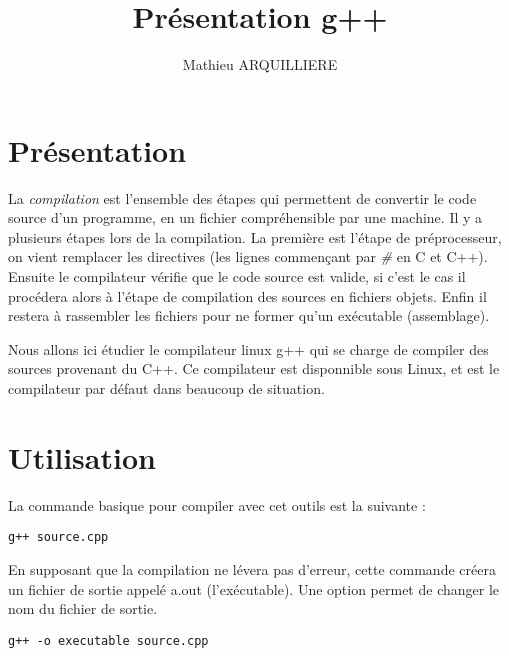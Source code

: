 \documentclass[a4paper, 12pt]{article}
\title{Présentation g++}
\author{Mathieu ARQUILLIERE}
\begin{document}
\maketitle
\pagebreak
\tableofcontents
\pagebreak
\section{Présentation}
    La \emph{compilation} est l'ensemble des étapes qui permettent de convertir le code source d'un programme, en un fichier compréhensible par une machine.
    Il y a plusieurs étapes lors de la compilation. La première est l'étape de préprocesseur, on vient remplacer les directives (les lignes commençant par \emph{\#} en C et C++).
    Ensuite le compilateur vérifie que le code source est valide, si c'est le cas il procédera alors à l'étape de compilation des sources en fichiers objets. Enfin il restera à rassembler les fichiers pour ne former qu'un exécutable (assemblage).

    Nous allons ici étudier le compilateur linux g++ qui se charge de compiler des sources provenant du C++.
    Ce compilateur est disponnible sous Linux, et est le compilateur par défaut dans beaucoup de situation.

\section{Utilisation}
    La commande basique pour compiler avec cet outils est la suivante :
    \begin{mdframed}[backgroundcolor=light-gray, roundcorner=20pt,
        innerleftmargin=20, innertopmargin=1, innerbottommargin=1, 
        outerlinewidth=1, linecolor=darkgray]
        \begin{lstlisting}
g++ source.cpp
        \end{lstlisting}
    \end{mdframed} 

    En supposant que la compilation ne lévera pas d'erreur, cette commande créera un fichier de sortie appelé a.out (l'exécutable).
    Une option permet de changer le nom du fichier de sortie.
    \begin{mdframed}[backgroundcolor=light-gray, roundcorner=20pt,
        innerleftmargin=20, innertopmargin=1, innerbottommargin=1, 
        outerlinewidth=1, linecolor=darkgray]
        \begin{lstlisting}
g++ -o executable source.cpp
        \end{lstlisting}
    \end{mdframed}
\end{document}
